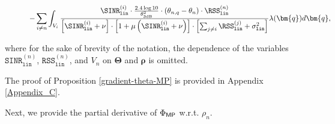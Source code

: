 \begin{Proposition}
\begin{figure*}[t!]
\begin{multline}
    - \sum_{i\neq n}   \int_{V_i }  \frac{\SINR^{(i)}_{\mathtt{lin}} \cdot \frac{2.4 \log 10}{\theta^2_{\text{3dB}}} \cdot \left(\theta_{n,q} - \theta_n \right)\cdot \RSS^{(n)}_{\mathtt{lin}}  }{\left[\SINR^{(i)}_{\mathtt{lin}} + \nu \right] \cdot 
    \left[ 1 + \mu \left( \SINR^{(i)}_{\mathtt{lin}} + \nu \right) \right] \cdot \left[ {\sum_{j\neq i}^{} \RSS^{(j)}_{\mathtt{lin}}  + \sigma^2_{\mathtt{lin}}} \right] }   \lambda(\bm{q})d\bm{q}   ,  
\end{multline}   
\end{figure*}
where for the sake of brevity of the notation, the dependence of the variables $\mathtt{SINR}_{\mathtt{lin}}^{(n)}$, $\mathtt{RSS}_{\mathtt{lin}}^{(n)}$, and $V_n$ on $\bm{\Theta}$ and $\bm{\rho}$ is omitted.
\end{Proposition}
The proof of Proposition \ref{gradient-theta-MP} is provided in Appendix \ref{Appendix_C}.



Next, we provide the partial derivative of $\Phi_{{\sf MP}}$ w.r.t. $\rho_n$.

